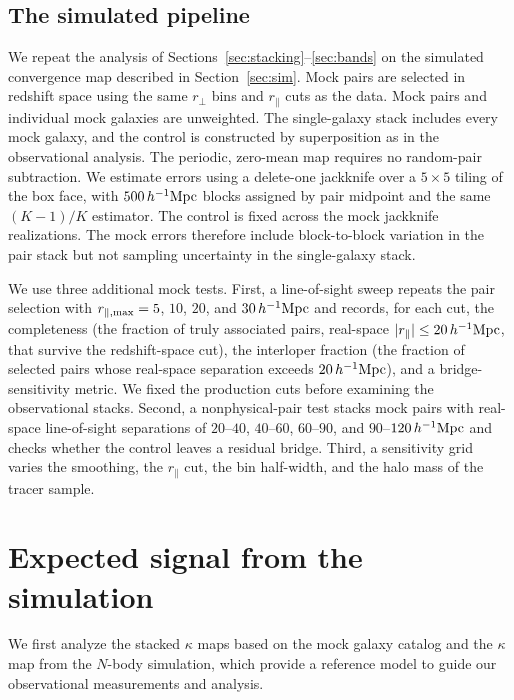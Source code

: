 \documentclass[preprint]{aastex701}
\newcommand{\hinvMpc}{h^{-1}{\rm Mpc}}
\begin{document}
 {
\subsection{The simulated pipeline}
\label{sec:sim_pipeline}

We repeat the analysis of Sections~\ref{sec:stacking}--\ref{sec:bands} on the
simulated convergence map described in Section~\ref{sec:sim}. Mock pairs are
selected in redshift space using the same $r_{\perp}$ bins and
$r_{\parallel}$ cuts as the data. Mock pairs and individual mock galaxies
are unweighted. The single-galaxy stack includes every mock galaxy, and the
control is constructed by superposition as in the observational analysis.
The periodic, zero-mean map requires no random-pair subtraction. We estimate
errors using a delete-one jackknife over a $5\times5$ tiling of the box face,
with $500\,\hinvMpc$ blocks assigned by pair midpoint and the same $(K-1)/K$
estimator. The control is fixed across the mock jackknife realizations. The
mock errors therefore include block-to-block variation in the pair stack but
not sampling uncertainty in the single-galaxy stack.

We use three additional mock tests. First, a line-of-sight sweep repeats
the pair selection with $r_{\parallel,{\rm max}}=5$, $10$, $20$, and
$30\,\hinvMpc$ and records, for each cut, the completeness (the fraction of
truly associated pairs, real-space $|r_{\parallel}|\leq20\,\hinvMpc$, that
survive the redshift-space cut), the interloper fraction (the fraction of
selected pairs whose real-space separation exceeds $20\,\hinvMpc$), and a
bridge-sensitivity metric. We fixed the production cuts before examining the
observational stacks.
Second, a nonphysical-pair test stacks mock pairs with real-space
line-of-sight separations of $20$--$40$, $40$--$60$, $60$--$90$, and
$90$--$120\,\hinvMpc$ and checks whether the control leaves a residual bridge.
Third, a sensitivity grid varies the smoothing, the $r_{\parallel}$ cut, the
bin half-width, and the halo mass of the tracer sample.
}\fi

\section{Expected signal from the simulation}
\label{sec:sim_expect}

We first analyze the stacked $\kappa$ maps based on the mock galaxy catalog and the $\kappa$ map from the $N$-body simulation, which provide a reference model to guide our observational measurements and analysis. 
\end{document}
